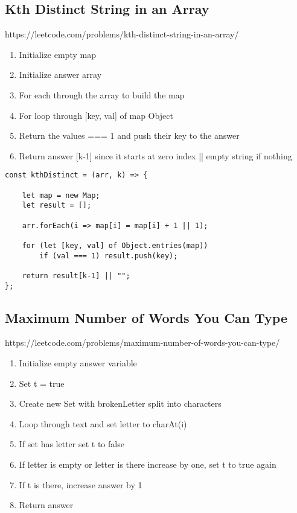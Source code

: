 \documentclass[10pt]{article}
\begin{document}
\subsection{Kth Distinct String in an Array}
https://leetcode.com/problems/kth-distinct-string-in-an-array/
\begin{enumerate}
	\item Initialize empty map 
	\item Initialize answer array 
	\item For each through the array to build the map
	\item For loop through [key, val] of map Object 
	\item Return the values === 1 and push their key to the answer
	\item Return answer [k-1] since it starts at zero index || empty string if nothing
\end{enumerate}

\begin{lstlisting}[title=Solution kthDistinct, captionpos=t]
const kthDistinct = (arr, k) => {
    
    let map = new Map;
    let result = [];
    
    arr.forEach(i => map[i] = map[i] + 1 || 1);
    
    for (let [key, val] of Object.entries(map)) 
        if (val === 1) result.push(key);
    
    return result[k-1] || "";
};
\end{lstlisting}

\medskip %







\pagebreak %
\medskip   
\subsection{Maximum Number of Words You Can Type}
https://leetcode.com/problems/maximum-number-of-words-you-can-type/

\begin{enumerate}
	\item Initialize empty answer variable
	\item Set t = true 
	\item Create new Set with brokenLetter split into characters
	\item Loop through text and set letter to charAt(i)
	\item If set has letter set t to false 
	\item If letter is empty or letter is there increase by one, set t to true again
	\item If t is there, increase answer by 1	
	\item Return answer
\end{enumerate}
\end{document}
